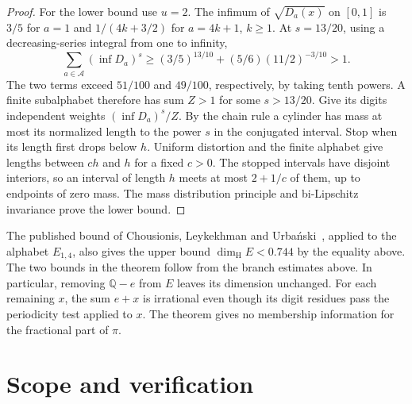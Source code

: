 \documentclass[11pt]{article}
\theoremstyle{definition}
\theoremstyle{remark}
\newcommand{\dimH}{\dim_{\mathrm{H}}}
\begin{document}
\begin{proof}
For the lower bound use $u=2$. The infimum of $\sqrt{D_a(x)}$ on
$[0,1]$ is $3/5$ for $a=1$ and $1/(4k+3/2)$ for $a=4k+1$, $k\ge1$.
At $s=13/20$, using a decreasing-series integral from one to infinity,
\[
 \sum_{a\in\mathcal A}(\inf D_a)^s
 \ge(3/5)^{13/10}+(5/6)(11/2)^{-3/10}>1.
\]
The two terms exceed $51/100$ and $49/100$, respectively, by taking
tenth powers. A finite subalphabet therefore has sum $Z>1$ for some
$s>13/20$. Give its digits independent weights $(\inf D_a)^s/Z$.
By the chain rule a cylinder has mass at most its normalized length
to the power $s$ in the conjugated interval. Stop when its length
first drops below $h$. Uniform distortion and the finite alphabet
give lengths between $ch$ and $h$ for a fixed $c>0$. The stopped
intervals have disjoint interiors, so an interval of length $h$ meets
at most $2+1/c$ of them, up to endpoints of zero mass. The mass
distribution principle and bi-Lipschitz invariance prove the lower bound.
\end{proof}
The published bound of Chousionis, Leykekhman and Urba\'nski~\cite[p.~23, eq.~(4.8), arXiv version]{CLU}, applied to the alphabet $E_{1,4}$, also gives the upper bound $\dimH E<0.744$ by the equality above. The two bounds in the theorem follow from the branch estimates above.
In particular, removing $\mathbb Q-e$ from $E$ leaves its dimension
unchanged. For each remaining $x$, the sum $e+x$ is irrational even
though its digit residues pass the periodicity test applied to $x$.
The theorem gives no membership information for the fractional part of
$\pi$.
\section{Scope and verification}
\end{document}
